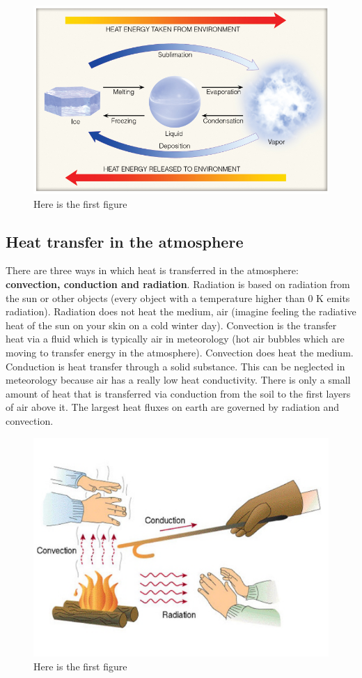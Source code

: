 \documentclass[oneside]{book}
\begin{document}
\begin{figure}

{\centering \includegraphics[width=0.5\linewidth]{figures/Figure116} 

}

\caption{Here is the first figure}\label{fig:LSheat}
\end{figure}

\subsection{Heat transfer in the
atmosphere}\label{heat-transfer-in-the-atmosphere}

There are three ways in which heat is transferred in the atmosphere:
\textbf{convection, conduction and radiation}. Radiation is based on
radiation from the sun or other objects (every object with a temperature
higher than 0 K emits radiation). Radiation does not heat the medium,
air (imagine feeling the radiative heat of the sun on your skin on a
cold winter day). Convection is the transfer heat via a fluid which is
typically air in meteorology (hot air bubbles which are moving to
transfer energy in the atmosphere). Convection does heat the medium.
Conduction is heat transfer through a solid substance. This can be
neglected in meteorology because air has a really low heat conductivity.
There is only a small amount of heat that is transferred via conduction
from the soil to the first layers of air above it. The largest heat
fluxes on earth are governed by radiation and convection.

\begin{figure}

{\centering \includegraphics[width=0.5\linewidth]{figures/Figure117} 

}

\caption{Here is the first figure}\label{fig:Heattransfer}
\end{figure}
\end{document}

